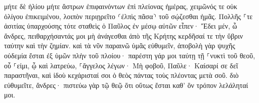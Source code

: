 \documentclass{openreader}
\begin{document}
μήτε δὲ ἡλίου μήτε ἄστρων ἐπιφαινόντων ἐπὶ πλείονας ἡμέρας, χειμῶνός τε οὐκ ὀλίγου ἐπικειμένου, λοιπὸν περιῃρεῖτο ⸂ἐλπὶς πᾶσα⸃ τοῦ σῴζεσθαι ἡμᾶς. 
Πολλῆς ⸀τε ἀσιτίας ὑπαρχούσης τότε σταθεὶς ὁ Παῦλος ἐν μέσῳ αὐτῶν εἶπεν· Ἔδει μέν, ὦ ἄνδρες, πειθαρχήσαντάς μοι μὴ ἀνάγεσθαι ἀπὸ τῆς Κρήτης κερδῆσαί τε τὴν ὕβριν ταύτην καὶ τὴν ζημίαν. 
καὶ τὰ νῦν παραινῶ ὑμᾶς εὐθυμεῖν, ἀποβολὴ γὰρ ψυχῆς οὐδεμία ἔσται ἐξ ὑμῶν πλὴν τοῦ πλοίου· 
παρέστη γάρ μοι ταύτῃ τῇ ⸀νυκτὶ τοῦ θεοῦ, οὗ ⸀εἰμι, ᾧ καὶ λατρεύω, ⸀ἄγγελος 
λέγων· Μὴ φοβοῦ, Παῦλε· Καίσαρί σε δεῖ παραστῆναι, καὶ ἰδοὺ κεχάρισταί σοι ὁ θεὸς πάντας τοὺς πλέοντας μετὰ σοῦ. 
διὸ εὐθυμεῖτε, ἄνδρες· πιστεύω γὰρ τῷ θεῷ ὅτι οὕτως ἔσται καθ’ ὃν τρόπον λελάληταί μοι. 
\end{document}
